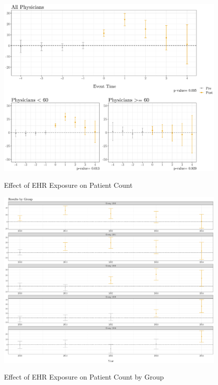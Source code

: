 \documentclass[11pt]{article}
\begin{document}
\begin{figure}[p]
    \centering
    \caption{Effect of EHR Exposure on Patient Count}
    \includegraphics[scale=.4]{Objects/patient_plot.pdf}
    \label{fig:patient}
\end{figure}


\begin{figure}[p]
    \centering
    \caption{Effect of EHR Exposure on Patient Count by Group}
    \includegraphics[scale=.3]{Objects/patient_group.pdf}
    \label{fig:patientgroup}
\end{figure}
\end{document}
